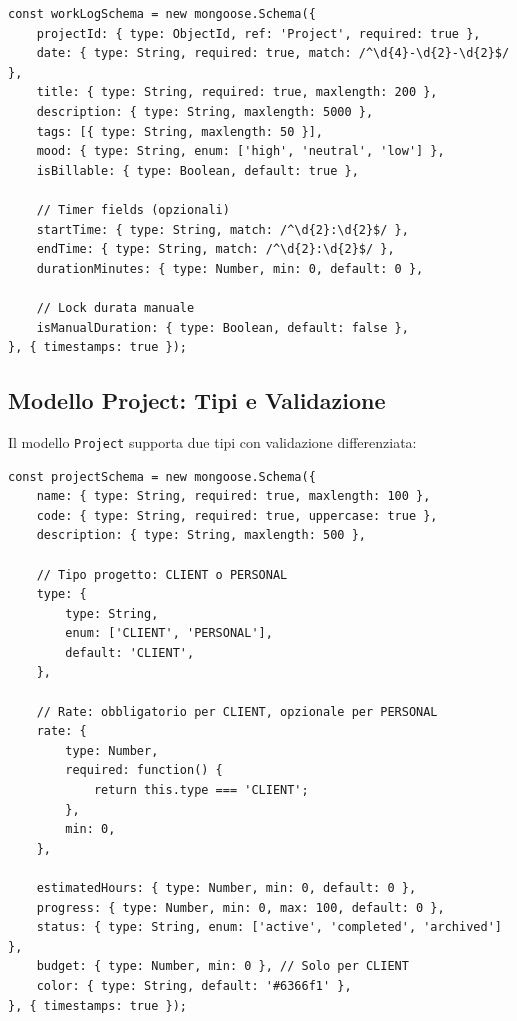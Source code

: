 \documentclass[11pt,a4paper]{article}
\begin{document}
\begin{lstlisting}[caption=Schema WorkLog Unificato]
const workLogSchema = new mongoose.Schema({
    projectId: { type: ObjectId, ref: 'Project', required: true },
    date: { type: String, required: true, match: /^\d{4}-\d{2}-\d{2}$/ },
    title: { type: String, required: true, maxlength: 200 },
    description: { type: String, maxlength: 5000 },
    tags: [{ type: String, maxlength: 50 }],
    mood: { type: String, enum: ['high', 'neutral', 'low'] },
    isBillable: { type: Boolean, default: true },
    
    // Timer fields (opzionali)
    startTime: { type: String, match: /^\d{2}:\d{2}$/ },
    endTime: { type: String, match: /^\d{2}:\d{2}$/ },
    durationMinutes: { type: Number, min: 0, default: 0 },
    
    // Lock durata manuale
    isManualDuration: { type: Boolean, default: false },
}, { timestamps: true });
\end{lstlisting}

\subsection{Modello Project: Tipi e Validazione}

Il modello \texttt{Project} supporta due tipi con validazione differenziata:

\begin{lstlisting}[caption=Schema Project con Tipi]
const projectSchema = new mongoose.Schema({
    name: { type: String, required: true, maxlength: 100 },
    code: { type: String, required: true, uppercase: true },
    description: { type: String, maxlength: 500 },
    
    // Tipo progetto: CLIENT o PERSONAL
    type: {
        type: String,
        enum: ['CLIENT', 'PERSONAL'],
        default: 'CLIENT',
    },
    
    // Rate: obbligatorio per CLIENT, opzionale per PERSONAL
    rate: {
        type: Number,
        required: function() {
            return this.type === 'CLIENT';
        },
        min: 0,
    },
    
    estimatedHours: { type: Number, min: 0, default: 0 },
    progress: { type: Number, min: 0, max: 100, default: 0 },
    status: { type: String, enum: ['active', 'completed', 'archived'] },
    budget: { type: Number, min: 0 }, // Solo per CLIENT
    color: { type: String, default: '#6366f1' },
}, { timestamps: true });
\end{lstlisting}
\end{document}
